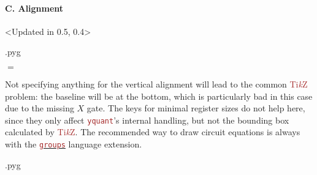 \documentclass{scrartcl}
\makeatletter
\newenvironment{codeexample}{%
   \VerbatimEnvironment%
   \let\FVB@VerbatimOut\minted@FVB@VerbatimOut
   \let\FVE@VerbatimOut\minted@FVE@VerbatimOut
   \minted@configlang{tex}%
   \minted@fvset
   \begin{VerbatimOut}[codes={\catcode`\^^I=12},firstline,lastline]{\minted@jobname.pyg}%
}{
   \end{VerbatimOut}%
   \minted@langlinenoson%
   \savebox\codeexamplebox{ \minted@jobname.pyg}%
   \ifdim\wd\codeexamplebox>\dimexpr.5\linewidth-3mm\relax%
      \wd\codeexamplebox=.5\linewidth%
   \else%
      \wd\codeexamplebox=\dimexpr\wd\codeexamplebox+3mm\relax%
   \fi%
   \noindent\begin{minipage}{\wd\codeexamplebox}%
      \centering%
      \usebox\codeexamplebox%
   \end{minipage}%
   \begin{minipage}{\dimexpr\linewidth-\wd\codeexamplebox\relax}%
      \expandafter\minted@pygmentize\expandafter{\minted@lang}%
   \end{minipage}%
   \minted@langlinenosoff%
   \par%
}
\def\TikZ{\textcolor{brown}{Ti\textit kZ}}
\def\pkg#1{\textcolor{brown}{\texttt{#1}}}
\def\langlink#1{\hyperref[sec:foreign:#1]{\pkg{#1}}}
\def\Yquant{\pkg{yquant}}
\makeatother
\begin{document}
            \paragraph{C. Alignment}\leavevmode
               \begin{example}<Updated in 0.5, 0.4>
                  \begin{codeexample}
$=$
                  \end{codeexample}
                  Not specifying anything for the vertical alignment will lead to the common \TikZ{} problem: the baseline will be at the bottom, which is particularly bad in this case due to the missing $X$ gate.
                  The keys for minimal register sizes do not help here, since they only affect \Yquant's internal handling, but not the bounding box calculated by \TikZ.
                  The recommended way to draw circuit equations is always with the \langlink{groups} language extension.

                  \begin{codeexample}
\begin{yquantgroup}
   \equals
\end{yquantgroup}
                  \end{codeexample}
               \end{example}
\end{document}
